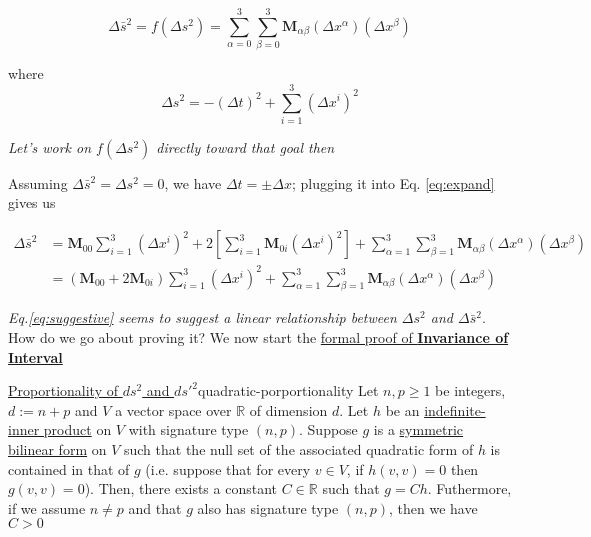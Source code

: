 \begin{tcolorbox}
    \[
        \Delta \bar{s}^2 = f\left( \Delta s^2 \right) = \sum_{\alpha = 0}^3\sum_{\beta = 0}^3 \boldsymbol{M}_{\alpha\beta}\left(\Delta x^{\alpha}\right)\left(\Delta x^{\beta}\right)
    \]

    where \[ \Delta s^2 = -(\Delta t)^2 + \sum_{i = 1}^3 (\Delta x^i)^2 \]

    \begin{center}
        \textit{Let's work on $f\left( \Delta s^2 \right)$ directly toward that goal then}
    \end{center}
\end{tcolorbox}

Assuming $\Delta \bar{s}^2 = \Delta s^2 = 0$, we have $\Delta t = \pm\Delta x$; plugging it into Eq. \ref{eq:expand} gives us

\begin{align}
    \Delta\bar{s}^2 &= \boldsymbol{M}_{00}\sum_{i = 1}^3\left( \Delta x^i \right)^2 + 2\left[ \sum_{i = 1}^3\boldsymbol{M}_{0i}\left( \Delta x^i \right)^2 \right] + \sum_{\alpha = 1}^3\sum_{\beta = 1}^3 \boldsymbol{M}_{\alpha\beta}\left(\Delta x^{\alpha}\right)\left(\Delta x^{\beta}\right) \\
    &= \left( \boldsymbol{M}_{00} + 2\boldsymbol{M}_{0i} \right)\sum_{i = 1}^3\left( \Delta x^i \right)^2 + \sum_{\alpha = 1}^3\sum_{\beta = 1}^3 \boldsymbol{M}_{\alpha\beta}\left(\Delta x^{\alpha}\right)\left(\Delta x^{\beta}\right) \label{eq:suggestive}
\end{align}

\textit{Eq.\ref{eq:suggestive} seems to suggest a linear relationship between $\Delta s^2$ and $\Delta\bar{s}^2$}. How do we go about proving it? We now start the \href{https://en.wikipedia.org/wiki/Derivations\_of\_the\_Lorentz\_transformations#Rigorous\_Statement\_and\_Proof\_of\_Proportionality_of_ds2_and_ds\%E2\%80\%B22}{formal proof of \textbf{Invariance of Interval}}

\begin{Theorem}{\href{https://en.wikipedia.org/wiki/Derivations\_of\_the\_Lorentz\_transformations\#Rigorous\_Statement\_and\_Proof\_of\_Proportionality\_of\_ds2\_and\_ds\%E2\%80\%B22}{Proportionality of $ds^2$ and $ds'^2$}}{quadratic-porportionality}
    Let $n, p \ge 1$ be integers, $d := n + p$ and $V$ a vector space over $\mathbb{R}$ of dimension $d$. Let $h$ be
    an \hyperref[def:indefinite-inner-product]{indefinite-inner product} on $V$ with signature type $(n, p)$. Suppose $g$ is a
    \hyperlink{bilinear-form}{symmetric bilinear form} on $V$ such that the null set of the associated quadratic form of
    $h$ is contained in that of $g$ (i.e. suppose that for every $v \in V$, if $h(v, v) = 0$ then $g(v, v) = 0$). Then,
    there exists a constant $C \in \mathbb{R}$ such that $g = Ch$. Futhermore, if we assume $n \ne p$ and that $g$ also
    has signature type $(n, p)$, then we have $C > 0$
\end{Theorem}

